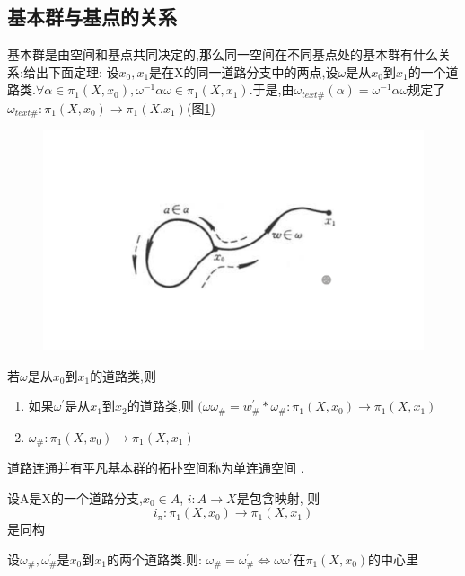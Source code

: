 \subsection*{基本群与基点的关系}
基本群是由空间和基点共同决定的,那么同一空间在不同基点处的基本群有什么关系:给出下面定理: 
设\(x_0 ,x_1 \)是在X的同一道路分支中的两点,设\(\omega\)是从\(x_0\)到\(x_1\)的一个道路类.\(\forall \alpha \in \pi_1 (X,x_0), \omega^{-1}\alpha\omega \in \pi_1 (X ,x_1) \).于是,由\(\omega_{text{\#}}(\alpha) = \omega^{-1}\alpha\omega \)规定了\(\omega_{text{\#}} : \pi_1(X,x_0) \rightarrow \pi_1 (X.x_1)\)(图\ref{fig:enter-label_21})
\begin{figure}[H]
    \centering
    \includegraphics[width=0.5\linewidth]{image_21.png}
    \caption{}
    \label{fig:enter-label_21}
\end{figure}
\begin{theorem}
    若\(\omega\)是从\(x_0\)到\(x_1\)的道路类,则 
    \begin{enumerate}
        \item 如果\(\omega^{'}\)是从\(x_1\)到\(x_2\)的道路类,则
        \((\omega\omega_{\#} = w^{'}_{\#} * \omega_{\#} : \pi_1 (X,x_0) \rightarrow \pi_1 (X ,x_1)\) \\
        \item \(\omega_{\#} : \pi_1 (X,x_0) \rightarrow \pi_1 (X ,x_1)\)
    \end{enumerate}
\end{theorem}
\begin{definition}
    道路连通并有平凡基本群的拓扑空间称为单连通空间 . 
\end{definition}
\begin{corollary}
    设A是X的一个道路分支,\(x_0 \in A \), \(i : A \rightarrow X\)是包含映射, 则
    \[i_{\pi} : \pi_1 (X,x_0) \rightarrow \pi_1 (X ,x_1)\]
    是同构
\end{corollary}
\begin{theorem}
    设\(\omega_{\#} , \omega^{'}_{\#}\)是\(x_0\)到\(x_1\)的两个道路类.则: 
    \(\omega_{\#} =\omega^{'}_{\#} \Leftrightarrow \omega\omega^{'}\text{在}\pi_1(X,x_0) \text{的中心里}\)
\end{theorem}
